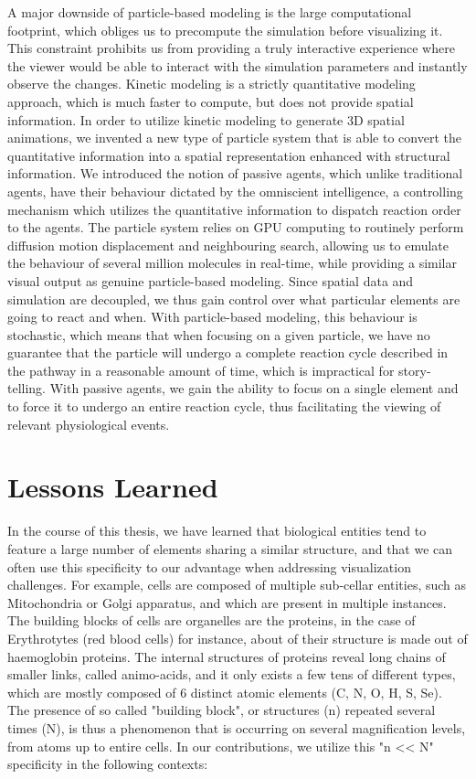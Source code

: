 A major downside of particle-based modeling is the large computational footprint, which obliges us to precompute the simulation before visualizing it.
This constraint prohibits us from providing a truly interactive experience where the viewer would be able to interact with the simulation parameters and instantly observe the changes.
Kinetic modeling is a strictly quantitative modeling approach, which is much faster to compute, but does not provide spatial information.
In order to utilize kinetic modeling to generate 3D spatial animations, we invented a new type of particle system that is able to convert the quantitative information into a spatial representation enhanced with structural information. 
We introduced the notion of passive agents, which unlike traditional agents, have their behaviour dictated by the omniscient intelligence, a controlling mechanism which utilizes the quantitative information to dispatch reaction order to the agents.
The particle system relies on GPU computing to routinely perform diffusion motion displacement and neighbouring search, allowing us to emulate the behaviour of several million molecules in real-time, while providing a similar visual output as genuine particle-based modeling.
Since spatial data and simulation are decoupled, we thus gain control over what particular elements are going to react and when.
With particle-based modeling, this behaviour is stochastic, which means that when focusing on a given particle, we have no guarantee that the particle will undergo a complete reaction cycle described in the pathway in a reasonable amount of time, which is impractical for story-telling.
With passive agents, we gain the ability to focus on a single element and to force it to undergo an entire reaction cycle, thus facilitating the viewing of relevant physiological events.

\section{Lessons Learned}

In the course of this thesis, we have learned that biological entities tend to feature a large number of elements sharing a similar structure, and that we can often use this specificity to our advantage when addressing visualization challenges.
For example, cells are composed of multiple sub-cellar entities, such as Mitochondria or Golgi apparatus, and which are present in multiple instances.
The building blocks of cells are organelles are the proteins, in the case of Erythrotytes (red blood cells) for instance, about  of their structure is made out of haemoglobin proteins. 
The internal structures of proteins reveal long chains of smaller links, called animo-acids, and it only exists a few tens of different types, which are mostly composed of 6 distinct atomic elements (C, N, O, H, S, Se).
The presence of so called "building block", or structures (n) repeated several times (N), is thus a phenomenon that is occurring on several magnification levels, from atoms up to entire cells.
In our contributions, we utilize this "n << N" specificity in the following contexts:

